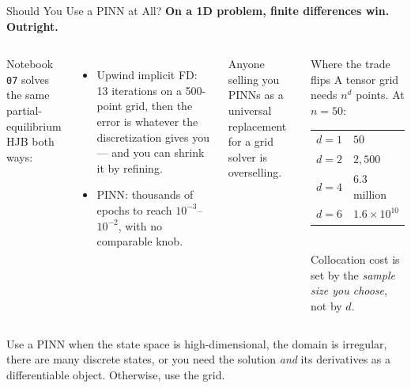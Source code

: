 \documentclass[aspectratio=169,11pt]{beamer}
\newcommand{\emphc}[1]{\textcolor{harvardcrimson}{#1}}
\begin{document}
\begin{frame}{Should You Use a PINN at All?}
\textbf{On a 1D problem, finite differences win. Outright.}

\vspace{0.4em}
\begin{columns}[T]
{\small Notebook \texttt{07} solves the same partial-equilibrium HJB both ways:}
\begin{itemize}\setlength\itemsep{2pt}
    \item \emphc{Upwind implicit FD}: 13 iterations on a 500-point grid, then the error is whatever the discretization gives you --- and you can shrink it by refining.
    \item \emphc{PINN}: thousands of epochs to reach $10^{-3}$--$10^{-2}$, with no comparable knob.
\end{itemize}

\vspace{0.5em}
{\small Anyone selling you PINNs as a universal replacement for a grid solver is overselling.}

\vspace{0.3em}

\begin{block}{Where the trade flips}
\footnotesize
A tensor grid needs $n^d$ points. At $n=50$:\\[3pt]
\begin{tabular}{@{}rl@{}}
$d=1$ & $50$ \\
$d=2$ & $2{,}500$ \\
$d=4$ & $6.3$ million \\
$d=6$ & $1.6\times10^{10}$ \\
\end{tabular}\\[4pt]
Collocation cost is set by the \emph{sample size you choose}, not by $d$.
\end{block}
\end{columns}

\vspace{0.4em}
{\footnotesize \emphc{Use a PINN when} the state space is high-dimensional, the domain is irregular, there are many discrete states, or you need the solution \emph{and} its derivatives as a differentiable object. Otherwise, use the grid.}
\end{frame}
\end{document}

